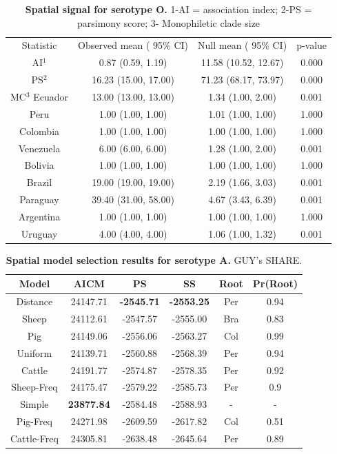 \documentclass[10pt]{article}
\begin{document}
\begin{table}[!ht]
\caption{
\textbf{Spatial signal for serotype O. } 1-AI = association index; 2-PS = parsimony score; 3- Monophiletic clade size}
\begin{tabular}{c|c|c|c}
Statistic &	Observed mean ( 95\% CI)&	Null mean ( 95\% CI)&	p-value\\
AI$^1$ &	0.87 (0.59, 1.19)&	11.58 (10.52, 12.67)&	0.000\\
PS$^2$ &	16.23 (15.00, 17.00)&	71.23 (68.17, 73.97)&	0.000\\
MC$^3$ Ecuador& 13.00 (13.00, 13.00)&	1.34 (1.00, 2.00)&	0.001\\
Peru&	1.00 (1.00, 1.00)&	1.01 (1.00, 1.00)&	1.000\\
Colombia&	1.00 (1.00, 1.00)&	1.00 (1.00, 1.00)&	1.000\\
Venezuela&	6.00 (6.00, 6.00)&	1.28 (1.00, 2.00)&	0.001\\
Bolivia &	1.00 (1.00, 1.00)&	1.00 (1.00, 1.00)&	1.000\\
Brazil&	19.00 (19.00, 19.00)&	2.19 (1.66, 3.03)&	0.001\\
Paraguay&	39.40 (31.00, 58.00)&	4.67 (3.43, 6.39)&	0.001\\
Argentina&	1.00 (1.00, 1.00)&	1.00 (1.00, 1.00)&	1.000\\
Uruguay&	4.00 (4.00, 4.00)&	1.06 (1.00, 1.32)&	0.001\\
\end{tabular}
\begin{flushleft}
\end{flushleft}
\label{tab:BaTSO}
 \end{table}
\begin{table}[!ht]
\caption{
\textbf{Spatial model selection results for serotype A. } GUY's SHARE.}
\begin{tabular}{c|c|c|c|c|c}
Model & AICM  & PS    & SS    & Root  & Pr(Root)\\
    \hline
    Distance & 24147.71 & \textbf{-2545.71} & \textbf{-2553.25} & Per   & 0.94 \\
    Sheep & 24112.61 & -2547.57 & -2555.00 & Bra   & 0.83 \\
    Pig & 24149.06 & -2556.06 & -2563.27 & Col   & 0.99 \\
    Uniform & 24139.71 & -2560.88 & -2568.39 & Per   & 0.94 \\
    Cattle & 24191.77 & -2574.87 & -2578.35 & Per   & 0.92 \\
    Sheep-Freq & 24175.47 & -2579.22 & -2585.73 & Per   & 0.9 \\
    Simple & \textbf{23877.84} & -2584.48 & -2588.93 & -     & - \\
    Pig-Freq & 24271.98 & -2609.59 & -2617.82 & Col   & 0.51 \\
    Cattle-Freq & 24305.81 & -2638.48 & -2645.64 & Per   & 0.89 \\
\end{tabular}
\begin{flushleft}
\end{flushleft}
\label{tab:prootA}
 \end{table}
\end{document}
